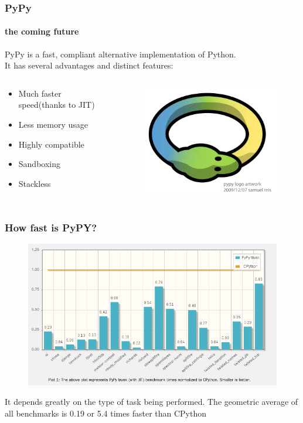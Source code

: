 \documentclass[compress=true]{beamer}
\begin{document}
\begin{frame}
	\frametitle{PyPy}
	\framesubtitle{the coming future}
	PyPy is a fast, compliant alternative implementation of Python.\\
	It has several advantages and distinct features:
	\begin{columns}
		\begin{column}{0.6\textwidth}
			\begin{itemize}
				\item Much faster speed(thanks to JIT)
				\item Less memory usage 
				\item Highly compatible
				\item Sandboxing
				\item Stackless
			\end{itemize}
		\end{column}
		\begin{column}{0.4\textwidth}
			\begin{figure}
				\includegraphics[height=0.4\textheight]{pypy.png}
			\end{figure}
		\end{column}
	\end{columns}
\end{frame}
\begin{frame}
	\frametitle{How fast is PyPY?}
	\begin{figure}
		\includegraphics[height=0.65\textheight]{fast_pypy_1.png}
	\end{figure}
	\tiny{It depends greatly on the type of task being performed. The geometric
	average of all benchmarks is 0.19 or 5.4 times faster than CPython}
\end{frame}
\end{document}

